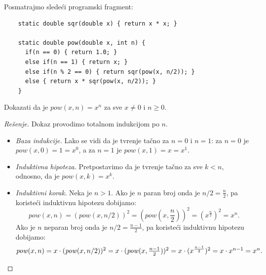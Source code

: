 \begin{EX}
  Posmatrajmo slede\'ci programski fragment:
{\small
\begin{verbatim}
    static double sqr(double x) { return x * x; }
    
    static double pow(double x, int n) {
      if(n == 0) { return 1.0; }
      else if(n == 1) { return x; }
      else if(n % 2 == 0) { return sqr(pow(x, n/2)); }
      else { return x * sqr(pow(x, n/2)); }
    }
\end{verbatim}
}
\noindent
  Dokazati da je $\mathit{pow}(x, n) = x^n$ za sve $x \ne 0$ i $n \ge 0$.
\end{EX}
\begin{proof}[Re\v senje]
  Dokaz provodimo totalnom indukcijom po $n$.
  \begin{itemize}
  \item
    \emph{Baza indukcije.} Lako se vidi da je tvr\dj enje ta\v cno za $n = 0$ i $n = 1$:
    za $n = 0$ je $\mathit{pow}(x, 0) = 1 = x^0$, a za $n = 1$ je $\mathit{pow}(x, 1) = x = x^1$.
  
  \item
    \emph{Induktivna hipoteza.} Pretpostavimo da je tvr\dj enje ta\v cno za sve $k < n$, odnosno, da je $\mathit{pow}(x, k) = x^k$.
  \item
    \emph{Induktivni korak.} Neka je $n > 1$. Ako je $n$ paran broj onda je $n/2 = \frac n2$, pa koriste\'ci induktivnu hipotezu dobijamo:
    $$\textstyle
      \mathit{pow}(x, n) = (\mathit{pow}(x, n/2))^2 = (\mathit{pow}(x, \frac n2))^2 = (x^{\frac n2})^2 = x^n.
    $$
    Ako je $n$ neparan broj onda je $n/2 = \frac{n-1}2$, pa koriste\'ci induktivnu hipotezu dobijamo:
    $$\textstyle
      \mathit{pow}(x, n) = x \cdot (\mathit{pow}(x, n/2))^2 = x \cdot (\mathit{pow}(x, \frac{n-1}2))^2 = x \cdot (x^{\frac{n-1}2})^2 = x \cdot x^{n-1} = x^n. \qedhere
    $$
  \end{itemize}
\end{proof}


